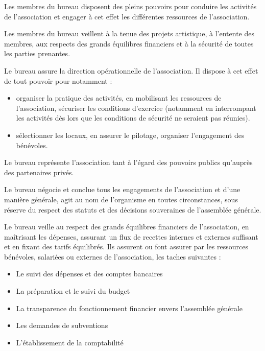 \documentclass[a4paper,french,10pt]{article}
\begin{document}
Les membres du bureau disposent des pleins pouvoirs pour conduire les
activités de l’association et engager à cet effet les différentes
ressources de l’association.

Les membres du bureau veillent à la tenue des projets artistique, à
l'entente des membres, aux respects des grands équilibres financiers
et à la sécurité de toutes les parties prenantes.  






Le bureau assure la direction opérationnelle de
l’association. Il dispose à cet effet de tout pouvoir pour notamment :
\begin{itemize}
\item organiser la pratique des activités, en mobilisant les
  ressources de l’association, sécuriser les conditions d’exercice
  (notamment en interrompant les activités dès lors que les conditions
  de sécurité ne seraient pas réunies).
\item sélectionner les locaux, en assurer le pilotage, organiser
  l’engagement des bénévoles.
\end{itemize}

Le bureau représente l’association tant à l’égard des pouvoirs
publics qu’auprès des partenaires privés.

Le bureau négocie et conclue tous les engagements de l’association et
d’une manière générale, agit au nom de l’organisme en toutes
circonstances, sous réserve du respect des statuts et des décisions
souveraines de l’assemblée générale.




Le bureau veille au respect des grands équilibres financiers de
l’association, en maîtrisant les dépenses, assurant un flux de
recettes internes et externes suffisant et en fixant des tarifs
équilibrés. Ils assurent ou font assurer par les ressources bénévoles,
salariées ou externes de l’association, les taches suivantes :
\begin{itemize}
\item Le suivi des dépenses et des comptes bancaires
\item La préparation et le suivi du budget
\item La transparence du fonctionnement financier envers l’assemblée générale
\item Les demandes de subventions
\item L’établissement de la comptabilité
\end{itemize}
\end{document}
